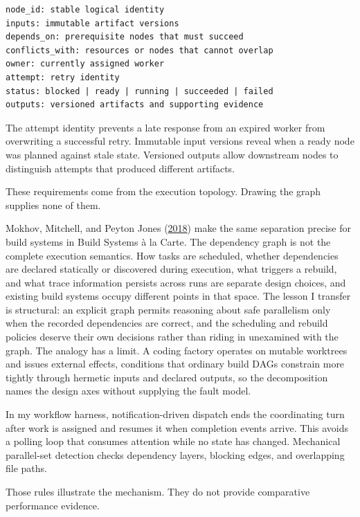 \begin{verbatim}
node_id: stable logical identity
inputs: immutable artifact versions
depends_on: prerequisite nodes that must succeed
conflicts_with: resources or nodes that cannot overlap
owner: currently assigned worker
attempt: retry identity
status: blocked | ready | running | succeeded | failed
outputs: versioned artifacts and supporting evidence
\end{verbatim}

The attempt identity prevents a late response from an expired worker from overwriting a successful retry. Immutable input versions reveal when a ready node was planned against stale state. Versioned outputs allow downstream nodes to distinguish attempts that produced different artifacts.

These requirements come from the execution topology. Drawing the graph supplies none of them.

Mokhov, Mitchell, and Peyton Jones (\href{https://www.microsoft.com/en-us/research/wp-content/uploads/2018/03/build-systems-final.pdf}{2018}) make the same separation precise for build systems in Build Systems à la Carte. The dependency graph is not the complete execution semantics. How tasks are scheduled, whether dependencies are declared statically or discovered during execution, what triggers a rebuild, and what trace information persists across runs are separate design choices, and existing build systems occupy different points in that space. The lesson I transfer is structural: an explicit graph permits reasoning about safe parallelism only when the recorded dependencies are correct, and the scheduling and rebuild policies deserve their own decisions rather than riding in unexamined with the graph. The analogy has a limit. A coding factory operates on mutable worktrees and issues external effects, conditions that ordinary build DAGs constrain more tightly through hermetic inputs and declared outputs, so the decomposition names the design axes without supplying the fault model.

In my workflow harness, notification-driven dispatch ends the coordinating turn after work is assigned and resumes it when completion events arrive. This avoids a polling loop that consumes attention while no state has changed. Mechanical parallel-set detection checks dependency layers, blocking edges, and overlapping file paths.

Those rules illustrate the mechanism. They do not provide comparative performance evidence.

